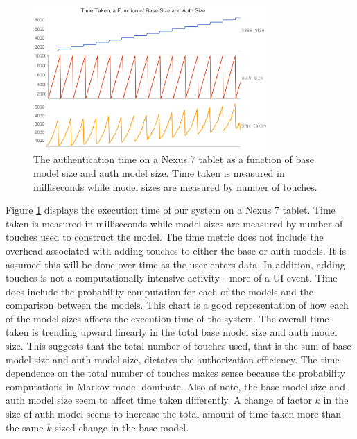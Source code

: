 \documentclass{acm_proc_article-sp}
\begin{document}
%

\begin{figure}
\centering
\includegraphics[width=3.5in]{nexus_speed_test.png}
\caption{The authentication time on a Nexus 7 tablet as a function of base model size and auth model size. Time taken is measured in milliseconds while model sizes are measured by number of touches.}
\label{fig:nexus_speed_test}
\end{figure}

Figure \ref{fig:nexus_speed_test} displays the execution time of our system on a Nexus 7 tablet. Time taken is measured in milliseconds while model sizes are measured by number of touches used to construct the model. 
The time metric does not include the overhead associated with adding touches to either the base or auth models. It is assumed this will be done over time as the user enters data. In addition, adding touches is not a computationally intensive activity - more of a UI event. 
Time does include the probability computation for each of the models and the comparison between the models.
This chart is a good representation of how each of the model sizes affects the execution time of the system.
 The overall time taken is trending upward linearly in the total base model size and auth model size.
 This suggests that the total number of touches used, that is the sum of base model size and auth model size, dictates the authorization efficiency.
The time dependence on the total number of touches makes sense because the  probability computations in
Markov model dominate. 
Also of note, the base model size and auth model size seem to affect time taken differently. A change of 
factor $k$ in the size of auth model seems to increase the total amount of time taken more than the same $k$-sized change in the base model. 
\end{document}
